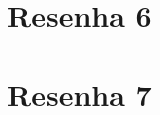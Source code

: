 \documentclass[
	12pt,				%
	openright,			%
	twoside,			%
	a4paper,			%
	english,			%
	brazil,				%
	svgnames
	]{abntex2}\usepackage[]{graphicx}\usepackage[]{color}
\begin{document}
\chapter{Resenha 6}
\label{cap:res6}

% 


\chapter{Resenha 7}
\label{cap:res7}

% 




\postextual


%

% 





\end{document}

